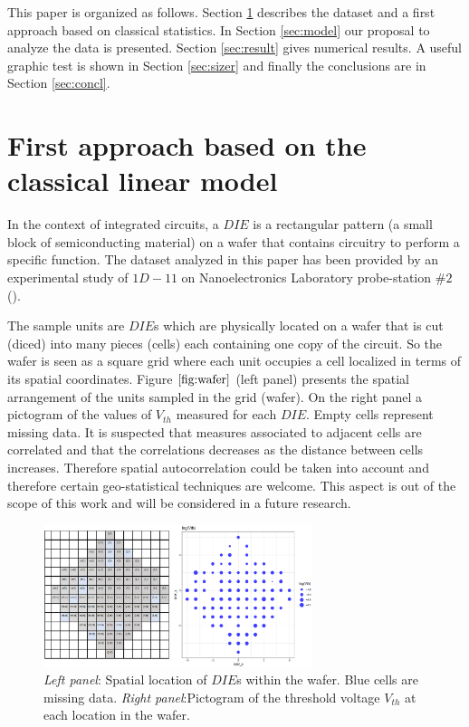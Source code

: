 \documentclass[sn-mathphys]{sn-jnl}%
\theoremstyle{thmstyleone}%
\theoremstyle{thmstyletwo}%
\theoremstyle{thmstylethree}%
\begin{document}
This paper is organized as follows. Section \ref{sec:dataset} describes the dataset and a first approach based on classical statistics. In Section \ref{sec:model} our proposal to analyze the data is presented.  Section \ref{sec:result} gives numerical results. A useful graphic test is shown in Section \ref{sec:sizer} and finally the conclusions are in Section \ref{sec:concl}.


\section{First approach based on the classical linear model} \label{sec:dataset}

In the context of integrated circuits, a $DIE$ is a rectangular pattern (a small block of semiconducting material) on a wafer that contains circuitry to perform a specific function.  
The dataset analyzed in this paper has been provided by an experimental study of { } {$1D-11$} on Nanoelectronics Laboratory probe-station $\# 2$ ({}). 

The sample units are $DIE$s which are physically  located on a wafer that is cut (diced) into many pieces (cells) each containing one copy of the circuit. So the wafer is seen as a square grid where each unit occupies a cell localized in terms of its spatial coordinates. 
Figure $\ref{fig:wafer}$ (left panel) presents the spatial arrangement of the units sampled in the grid (wafer). On the right panel a pictogram of the values of $V_{th}$ measured for each $DIE$. Empty cells represent missing data.
It is suspected that measures associated to  adjacent cells are correlated and that the correlations decreases as the distance between cells increases. Therefore spatial autocorrelation could be taken into account and therefore certain geo-statistical techniques are welcome. This aspect is out of the scope of this work and will be considered in a future research.

\begin{figure}[ht]
	\centering
		\includegraphics[width=0.7\textwidth]{Fig1_wafer2.eps}
	\caption{{\it Left panel}: Spatial location of $DIE$s within the wafer. Blue cells are missing data. {\it Right panel}:Pictogram of the threshold voltage $V_{th}$ at each location in the wafer.}
	\label{fig:wafer}
\end{figure}
\end{document}
